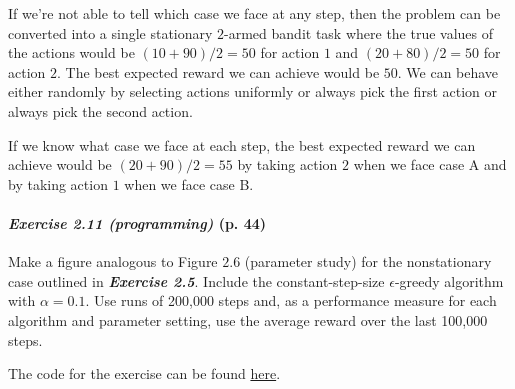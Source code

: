 \documentclass[10pt,a4paper]{article}
\begin{document}
\bigskip
If we're not able to tell which case we face at any step, then the problem can be converted into a single stationary $2$-armed bandit task where the true values of the actions would be $(10 + 90)/2 = 50$ for action $1$ and $(20 + 80)/2 = 50$ for action $2$. The best expected reward we can achieve would be $50$. We can behave either randomly by selecting actions uniformly or always pick the first action or always pick the second action.

If we know what case we face at each step, the best expected reward we can achieve would be $(20 + 90)/2=55$ by taking action $2$ when we face case A and by taking action $1$ when we face case B.


\paragraph{\textit{Exercise 2.11 (programming)} (p. 44)} Make a figure analogous to Figure $2.6$ (parameter study) for the nonstationary case outlined in \textbf{\textit{Exercise 2.5}}. Include the constant-step-size $\epsilon$-greedy algorithm with
$\alpha=0.1$. Use runs of 200,000 steps and, as a performance measure for each algorithm and parameter setting, use the average reward over the last 100,000 steps.

\bigskip
The code for the exercise can be found \href{https://github.com/Zenchiyu/learning-rl/blob/develop/Intro_RL_Sutton_book/Chap2-Multi-Armed-Bandits/non-stationary-testbed/parameter_study_non_stationary.py}{here}.
\end{document}
